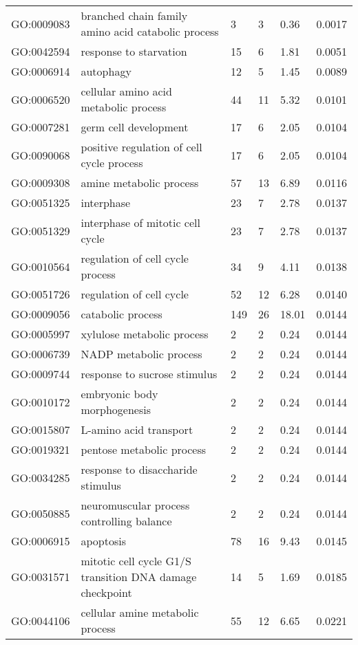 \documentclass[10pt]{bmc_article}
\newenvironment{bmcformat}{\begin{raggedright}\baselineskip20pt\sloppy\setboolean{publ}{false}}{\end{raggedright}\baselineskip20pt\sloppy}
\begin{document}
\begin{bmcformat}
\begin{longtable}{lp{3cm}llll}
  GO:0009083 & branched chain family amino acid catabolic process &   3 &   3 & 0.36 & 0.0017 \\ 
  GO:0042594 & response to starvation &  15 &   6 & 1.81 & 0.0051 \\ 
  GO:0006914 & autophagy &  12 &   5 & 1.45 & 0.0089 \\ 
  GO:0006520 & cellular amino acid metabolic process &  44 &  11 & 5.32 & 0.0101 \\ 
  GO:0007281 & germ cell development &  17 &   6 & 2.05 & 0.0104 \\ 
  GO:0090068 & positive regulation of cell cycle process &  17 &   6 & 2.05 & 0.0104 \\ 
  GO:0009308 & amine metabolic process &  57 &  13 & 6.89 & 0.0116 \\ 
  GO:0051325 & interphase &  23 &   7 & 2.78 & 0.0137 \\ 
  GO:0051329 & interphase of mitotic cell cycle &  23 &   7 & 2.78 & 0.0137 \\ 
  GO:0010564 & regulation of cell cycle process &  34 &   9 & 4.11 & 0.0138 \\ 
  GO:0051726 & regulation of cell cycle &  52 &  12 & 6.28 & 0.0140 \\ 
  GO:0009056 & catabolic process & 149 &  26 & 18.01 & 0.0144 \\ 
  GO:0005997 & xylulose metabolic process &   2 &   2 & 0.24 & 0.0144 \\ 
  GO:0006739 & NADP metabolic process &   2 &   2 & 0.24 & 0.0144 \\ 
  GO:0009744 & response to sucrose stimulus &   2 &   2 & 0.24 & 0.0144 \\ 
  GO:0010172 & embryonic body morphogenesis &   2 &   2 & 0.24 & 0.0144 \\ 
  GO:0015807 & L-amino acid transport &   2 &   2 & 0.24 & 0.0144 \\ 
  GO:0019321 & pentose metabolic process &   2 &   2 & 0.24 & 0.0144 \\ 
  GO:0034285 & response to disaccharide stimulus &   2 &   2 & 0.24 & 0.0144 \\ 
  GO:0050885 & neuromuscular process controlling balance &   2 &   2 & 0.24 & 0.0144 \\ 
  GO:0006915 & apoptosis &  78 &  16 & 9.43 & 0.0145 \\ 
  GO:0031571 & mitotic cell cycle G1/S transition DNA damage checkpoint &  14 &   5 & 1.69 & 0.0185 \\ 
  GO:0044106 & cellular amine metabolic process &  55 &  12 & 6.65 & 0.0221 \\ 

\end{longtable}
\end{bmcformat}
\end{document}
